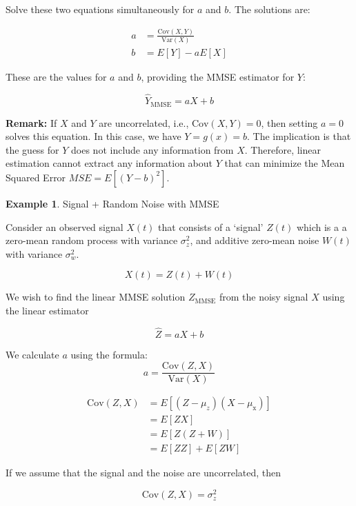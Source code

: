 \documentclass[12pt]{book}
\theoremstyle{definition}
\newtheorem{exmp}{Example}[chapter]
\begin{document}
Solve these two equations simultaneously for \(a\) and \(b\). The solutions are:

\begin{align*}
a &= \frac{\text{Cov}(X, Y)}{\text{Var}(X)} \\
b &= E[Y] - aE[X]
\end{align*}

These are the values for \(a\) and \(b\), providing the MMSE estimator for \(Y\):

\[ \hat{Y}_{\text{MMSE}} = aX + b \]


\textbf{Remark:} If $X$ and $Y$ are uncorrelated, i.e., $\text{Cov}(X, Y) = 0$, then setting $a = 0$ solves this equation. In this case, we have $Y = g(x) = b$. The implication is that the guess for $Y$ does not include any information from $X$. Therefore, linear estimation cannot extract any information about $Y$ that can minimize the Mean Squared Error $MSE = E[(Y - b)^2]$.\\


\begin{tcolorbox}
    \begin{exmp}{Signal + Random Noise with MMSE}
    
Consider an observed signal $X(t)$ that consists of a `signal' $Z(t)$ which is a a zero-mean random process with variance $\sigma_z^2$, and additive zero-mean noise $W(t)$ with variance $\sigma_w^2$.

\[ X(t) = Z(t) + W(t) \]

We wish to find the linear MMSE solution \(Z_\text{MMSE}\) from the noisy signal \(X\) using the linear estimator

\[
\hat{Z} = aX + b
\]
    
    \end{exmp}
\end{tcolorbox}

We calculate $a$ using the formula:
\[ a = \frac{\text{Cov}(Z, X)}{\text{Var}(X)} \]

\[
\begin{aligned}
\text{Cov}(Z, X) & = E[(Z-\mu_z)(X-\mu_\mathrm{x})]\\
                & = E[ZX]\\
                & = E[Z(Z+W)]\\
                & = E[ZZ] + E[ZW]
\end{aligned}
\]

If we assume that the signal and the noise are uncorrelated, then

\[
\text{Cov}(Z, X) = \sigma_z^2
\]
\end{document}
